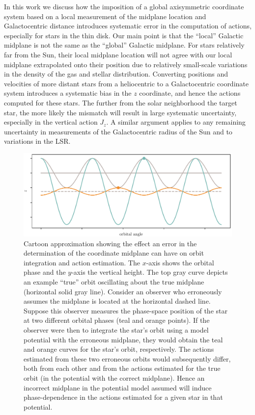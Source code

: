 \documentclass[twocolumn]{aastex62}
\begin{document}
In this work we discuss how the imposition of a global axisymmetric coordinate
system based on a local measurement of the midplane location and
Galactocentric distance introduces systematic error in the computation of
actions, especially for stars in the thin disk. Our main point is that the
``local'' Galactic midplane is not the same as the ``global'' Galactic
midplane. For stars relatively far from the Sun, their local midplane location
will not agree with our local midplane extrapolated onto their position due to
relatively small-scale variations in the density of the gas and stellar
distribution. Converting positions and velocities of more distant stars from a
heliocentric to a Galactocentric coordinate system introduces a systematic
bias in the $z$ coordinate, and hence the actions computed for these stars.
The further from the solar neighborhood the target star, the more likely the
mismatch will result in large systematic uncertainty, especially in the
vertical action $J_z$. A similar argument applies to any remaining uncertainty
in measurements of the Galactocentric radius of the Sun and to variations in
the LSR.

\begin{figure}[ht!]
\begin{center}
\includegraphics[width=\textwidth]{fig/cartoon.pdf}
\end{center}
\caption{Cartoon approximation showing the effect an error in the
determination of the coordinate midplane can have on orbit integration and
action estimation. The $x$-axis shows the orbital phase and the $y$-axis the
vertical height. The top gray curve depicts an example ``true'' orbit
oscillating about the true midplane (horizontal solid gray line). Consider an
observer who erroneously assumes the midplane is located at the horizontal
dashed line. Suppose this observer measures the phase-space position of the
star at two different orbital phases (teal and orange points). If the observer
were then to integrate the star's orbit using a model potential with the
erroneous midplane, they would obtain the teal and orange curves for the
star's orbit, respectively. The actions estimated from these two  erroneous
orbits would subsequently differ, both from each other and from the actions
estimated for the true orbit (in the potential with the correct midplane).
Hence an incorrect midplane in the potential model assumed will induce
phase-dependence in the actions estimated for a given star in that potential.}
\label{fig:cartoon}
\end{figure}
\end{document}

